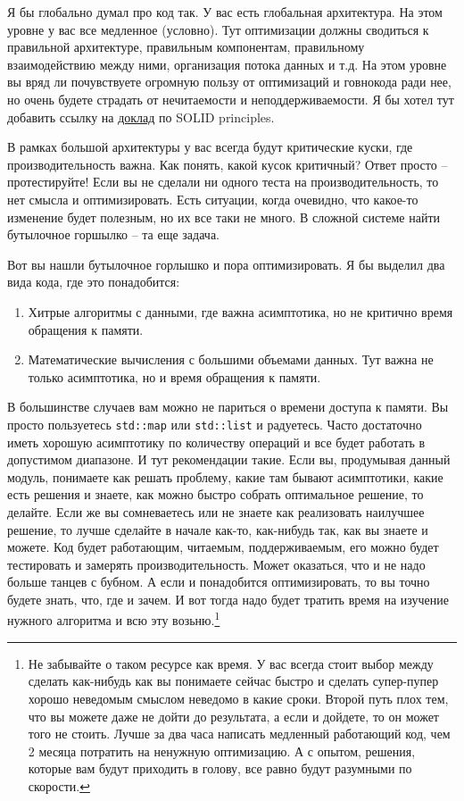 \documentclass{article}
\begin{document}
Я бы глобально думал про код так. У вас есть глобальная архитектура. На этом уровне у вас все медленное (условно). Тут оптимизации должны сводиться к правильной архитектуре, правильным компонентам, правильному взаимодействию между ними, организация потока данных и т.д. На этом уровне вы вряд ли почувствуете огромную пользу от оптимизаций и говнокода ради нее, но очень будете страдать от нечитаемости и неподдерживаемости. Я бы хотел тут добавить ссылку на \href{https://www.youtube.com/watch?v=Ntraj80qN2k}{доклад} по SOLID principles.

В рамках большой архитектуры у вас всегда будут критические куски, где производительность важна. Как понять, какой кусок критичный? Ответ просто -- протестируйте! Если вы не сделали ни одного теста на производительность, то нет смысла и оптимизировать. Есть ситуации, когда очевидно, что какое-то изменение будет полезным, но их все таки не много. В сложной системе найти бутылочное горшылко -- та еще задача.

Вот вы нашли бутылочное горлышко и пора оптимизировать. Я бы выделил два вида кода, где это понадобится:
\begin{enumerate}
\item Хитрые алгоритмы с данными, где важна асимптотика, но не критично время обращения к памяти.
\item Математические вычисления с большими объемами данных. Тут важна не только асимптотика, но и время обращения к памяти.
\end{enumerate}
В большинстве случаев вам можно не париться о времени доступа к памяти. Вы просто пользуетесь \verb"std::map" или \verb"std::list" и радуетесь. Часто достаточно иметь хорошую асимптотику по количеству операций и все будет работать в допустимом диапазоне. И тут рекомендации такие. Если вы, продумывая данный модуль, понимаете как решать проблему, какие там бывают асимптотики, какие есть решения и знаете, как можно быстро собрать оптимальное решение, то делайте. Если же вы сомневаетесь или не знаете как реализовать наилучшее решение, то лучше сделайте в начале как-то, как-нибудь так, как вы знаете и можете. Код будет работающим, читаемым, поддерживаемым, его можно будет тестировать и замерять производительность. Может оказаться, что и не надо больше танцев с бубном. А если и понадобится оптимизировать, то вы точно будете знать, что, где и зачем. И вот тогда надо будет тратить время на изучение нужного алгоритма и всю эту возьню.\footnote{Не забывайте о таком ресурсе как время. У вас всегда стоит выбор между сделать как-нибудь как вы понимаете сейчас быстро и сделать супер-пупер хорошо неведомым смыслом неведомо в какие сроки. Второй путь плох тем, что вы можете даже не дойти до результата, а если и дойдете, то он может того не стоить. Лучше за два часа написать медленный работающий код, чем 2 месяца потратить на ненужную оптимизацию. А с опытом, решения, которые вам будут приходить в голову, все равно будут разумными по скорости.}
\end{document}
